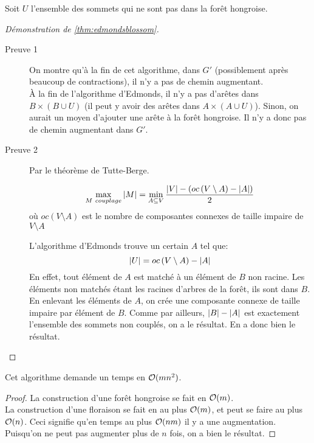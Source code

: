 \documentclass[math, info]{cours}
\begin{document}
Soit $U$ l'ensemble des sommets qui ne sont pas dans la forêt hongroise.

\begin{proof}[Démonstration de \ref{thm:edmondsblossom}]
	\begin{description}
		\item[Preuve 1] On montre qu'à la fin de cet algorithme, dans $G'$ (possiblement après beaucoup de contractions), il n'y a pas de chemin augmentant.\\
		      À la fin de l'algorithme d'Edmonds, il n'y a pas d'arêtes dans $B \times \left(B \cup U \right)$ (il peut y avoir des arêtes dans $A \times \left( A\cup U \right)$).
		      Sinon, on aurait un moyen d'ajouter une arête à la forêt hongroise.
		      Il n'y a donc pas de chemin augmentant dans $G'$.
		\item[Preuve 2] Par le théorème de Tutte-Berge.
		      \begin{thm}
			      \begin{equation*}
				      \max_{M \ couplage} \left|M\right| = \min_{A \subseteq V}\frac{\left|V\right| - \left(oc\left(V \setminus A \right) - \left|A\right| \right)}{2}
			      \end{equation*}
			      où $oc(V \setminus A)$ est le nombre de composantes connexes de taille impaire de $V \setminus A$
		      \end{thm}
		      L'algorithme d'Edmonds trouve un certain $A$ tel que:
		      \begin{equation*}
			      \left|U\right| = oc\left(V\setminus A \right) - \left|A\right|
		      \end{equation*}
		      En effet, tout élément de $A$ est matché à un élément de $B$ non racine.
		      Les éléments non matchés étant les racines d'arbres de la forêt, ils sont dans $B$.
		      En enlevant les éléments de $A$, on crée une composante connexe de taille impaire par élément de $B$.
		      Comme par ailleurs, $\left|B\right| - \left|A\right|$ est exactement l'ensemble des sommets non couplés, on a le résultat.
		      En a donc bien le résultat.
	\end{description}
\end{proof}

\begin{thm}
	Cet algorithme demande un temps en $\mathcal{O}(mn^{2})$.
	\label{prop:edmondsblossomtimecomplexity}
\end{thm}
\begin{proof}
	La construction d'une forêt hongroise se fait en $\mathcal{O}(m)$.\\
	La construction d'une floraison se fait en au plus $\mathcal{O}(m)$, et peut se faire au plus $\mathcal{O}(n)$.
	Ceci signifie qu'en temps au plus $\mathcal{O}(nm)$ il y a une augmentation.
	Puisqu'on ne peut pas augmenter plus de $n$ fois, on a bien le résultat.
\end{proof}
\end{document}
